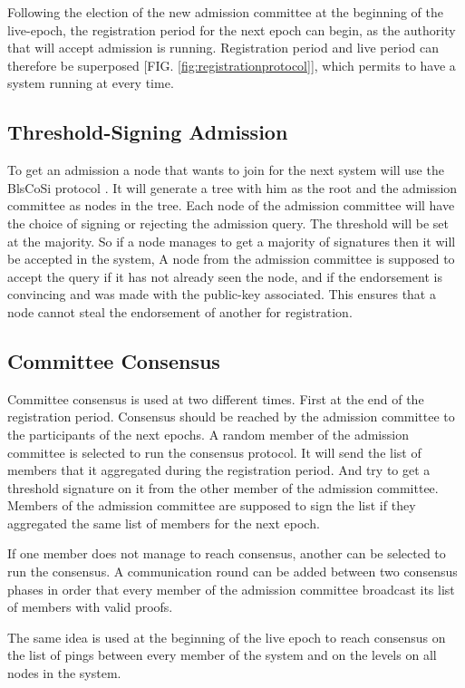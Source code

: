 \documentclass[a4paper,11pt,oneside]{report}
\begin{document}
Following the election of the new admission committee at the beginning of the
live-epoch, the registration period for the next epoch can begin, as the
authority that will accept admission is running. Registration period and live
period can therefore be superposed [FIG. \autoref{fig:registrationprotocol}], which
permits to have a system running at every time. 

\subsection{Threshold-Signing Admission}
To get an admission a node that wants to join for the next system will use the
BlsCoSi protocol \cite{Boneh2018}. It will generate a tree with him as
the root and the admission committee as nodes in the tree. Each node of the
admission committee will have the choice of signing or rejecting the admission
query. The threshold will be set at the majority. So if a node manages to get a
majority of signatures then it will be accepted in the system, A node from the
admission committee is supposed to accept the query if it has not already seen
the node, and if the endorsement is convincing and was made with the public-key
associated. This ensures that a node cannot steal the endorsement of another
for registration.  

\subsection{Committee Consensus}
Committee consensus is used at two different times. First at the end of the
registration period. Consensus should be reached by the admission committee to
the participants of the next epochs. A random member of the admission committee
is selected to run the consensus protocol. It will send the list of members
that it aggregated during the registration period. And try to get a threshold
signature on it from the other member of the admission committee. Members of
the admission committee are supposed to sign the list if they aggregated the
same list of members for the next epoch.

If one member does not manage to reach consensus, another can be selected to
run the consensus. A communication round can be added between two consensus
phases in order that every member of the admission committee broadcast its list
of members with valid proofs.

The same idea is used at the beginning of the live epoch to reach consensus on
the list of pings between every member of the system and on the levels on all
nodes in the system.
\end{document}
